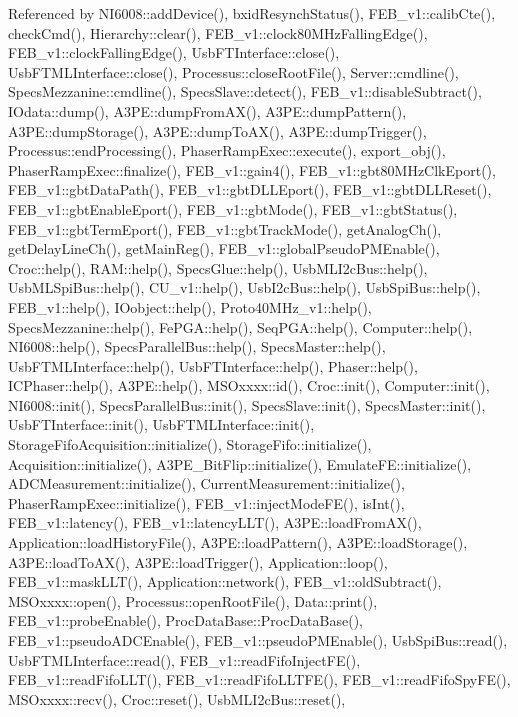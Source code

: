 Referenced by N\+I6008\+::add\+Device(), bxid\+Resynch\+Status(), F\+E\+B\+\_\+v1\+::calib\+Cte(), check\+Cmd(), Hierarchy\+::clear(), F\+E\+B\+\_\+v1\+::clock80\+M\+Hz\+Falling\+Edge(), F\+E\+B\+\_\+v1\+::clock\+Falling\+Edge(), Usb\+F\+T\+Interface\+::close(), Usb\+F\+T\+M\+L\+Interface\+::close(), Processus\+::close\+Root\+File(), Server\+::cmdline(), Specs\+Mezzanine\+::cmdline(), Specs\+Slave\+::detect(), F\+E\+B\+\_\+v1\+::disable\+Subtract(), I\+Odata\+::dump(), A3\+P\+E\+::dump\+From\+A\+X(), A3\+P\+E\+::dump\+Pattern(), A3\+P\+E\+::dump\+Storage(), A3\+P\+E\+::dump\+To\+A\+X(), A3\+P\+E\+::dump\+Trigger(), Processus\+::end\+Processing(), Phaser\+Ramp\+Exec\+::execute(), export\+\_\+obj(), Phaser\+Ramp\+Exec\+::finalize(), F\+E\+B\+\_\+v1\+::gain4(), F\+E\+B\+\_\+v1\+::gbt80\+M\+Hz\+Clk\+Eport(), F\+E\+B\+\_\+v1\+::gbt\+Data\+Path(), F\+E\+B\+\_\+v1\+::gbt\+D\+L\+L\+Eport(), F\+E\+B\+\_\+v1\+::gbt\+D\+L\+L\+Reset(), F\+E\+B\+\_\+v1\+::gbt\+Enable\+Eport(), F\+E\+B\+\_\+v1\+::gbt\+Mode(), F\+E\+B\+\_\+v1\+::gbt\+Status(), F\+E\+B\+\_\+v1\+::gbt\+Term\+Eport(), F\+E\+B\+\_\+v1\+::gbt\+Track\+Mode(), get\+Analog\+Ch(), get\+Delay\+Line\+Ch(), get\+Main\+Reg(), F\+E\+B\+\_\+v1\+::global\+Pseudo\+P\+M\+Enable(), Croc\+::help(), R\+A\+M\+::help(), Specs\+Glue\+::help(), Usb\+M\+L\+I2c\+Bus\+::help(), Usb\+M\+L\+Spi\+Bus\+::help(), C\+U\+\_\+v1\+::help(), Usb\+I2c\+Bus\+::help(), Usb\+Spi\+Bus\+::help(), F\+E\+B\+\_\+v1\+::help(), I\+Oobject\+::help(), Proto40\+M\+Hz\+\_\+v1\+::help(), Specs\+Mezzanine\+::help(), Fe\+P\+G\+A\+::help(), Seq\+P\+G\+A\+::help(), Computer\+::help(), N\+I6008\+::help(), Specs\+Parallel\+Bus\+::help(), Specs\+Master\+::help(), Usb\+F\+T\+M\+L\+Interface\+::help(), Usb\+F\+T\+Interface\+::help(), Phaser\+::help(), I\+C\+Phaser\+::help(), A3\+P\+E\+::help(), M\+S\+Oxxxx\+::id(), Croc\+::init(), Computer\+::init(), N\+I6008\+::init(), Specs\+Parallel\+Bus\+::init(), Specs\+Slave\+::init(), Specs\+Master\+::init(), Usb\+F\+T\+Interface\+::init(), Usb\+F\+T\+M\+L\+Interface\+::init(), Storage\+Fifo\+Acquisition\+::initialize(), Storage\+Fifo\+::initialize(), Acquisition\+::initialize(), A3\+P\+E\+\_\+\+Bit\+Flip\+::initialize(), Emulate\+F\+E\+::initialize(), A\+D\+C\+Measurement\+::initialize(), Current\+Measurement\+::initialize(), Phaser\+Ramp\+Exec\+::initialize(), F\+E\+B\+\_\+v1\+::inject\+Mode\+F\+E(), is\+Int(), F\+E\+B\+\_\+v1\+::latency(), F\+E\+B\+\_\+v1\+::latency\+L\+L\+T(), A3\+P\+E\+::load\+From\+A\+X(), Application\+::load\+History\+File(), A3\+P\+E\+::load\+Pattern(), A3\+P\+E\+::load\+Storage(), A3\+P\+E\+::load\+To\+A\+X(), A3\+P\+E\+::load\+Trigger(), Application\+::loop(), F\+E\+B\+\_\+v1\+::mask\+L\+L\+T(), Application\+::network(), F\+E\+B\+\_\+v1\+::old\+Subtract(), M\+S\+Oxxxx\+::open(), Processus\+::open\+Root\+File(), Data\+::print(), F\+E\+B\+\_\+v1\+::probe\+Enable(), Proc\+Data\+Base\+::\+Proc\+Data\+Base(), F\+E\+B\+\_\+v1\+::pseudo\+A\+D\+C\+Enable(), F\+E\+B\+\_\+v1\+::pseudo\+P\+M\+Enable(), Usb\+Spi\+Bus\+::read(), Usb\+F\+T\+M\+L\+Interface\+::read(), F\+E\+B\+\_\+v1\+::read\+Fifo\+Inject\+F\+E(), F\+E\+B\+\_\+v1\+::read\+Fifo\+L\+L\+T(), F\+E\+B\+\_\+v1\+::read\+Fifo\+L\+L\+T\+F\+E(), F\+E\+B\+\_\+v1\+::read\+Fifo\+Spy\+F\+E(), M\+S\+Oxxxx\+::recv(), Croc\+::reset(), Usb\+M\+L\+I2c\+Bus\+::reset(), 